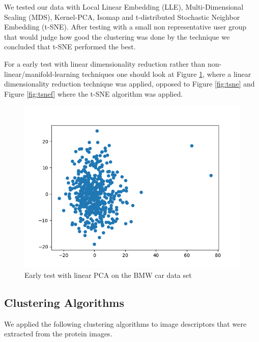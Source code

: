 \documentclass[journal]{vgtc}       %
\begin{document}
We tested our data with Local Linear Embedding (LLE), Multi-Dimensional Scaling (MDS), Kernel-PCA, Isomap and t-distributed Stochastic Neighbor Embedding (t-SNE).
After testing with a small non representative user group that would judge how good the clustering was done by the technique we concluded that t-SNE performed the best.

For a early test with linear dimensionality reduction rather than non-linear/manifold-learning techniques one should look at Figure \ref{fig:bmw}, where a linear dimensionality reduction technique was applied, opposed to Figure \ref{fig:tsne} and Figure \ref{fig:tsnef} where the t-SNE algorithm was applied.

\begin{figure}[t]
	\begin{center}
		\includegraphics[width=.75\linewidth]{Figure2.png}
	\end{center}
	\caption{\label{fig:bmw} Early test with linear PCA on the BMW car data set \cite{stanfordcar} }
\end{figure}


\subsection{Clustering Algorithms}\label{sec:clusteringa}
We applied the following clustering algorithms to image descriptors that were extracted from the protein images.
\end{document}
